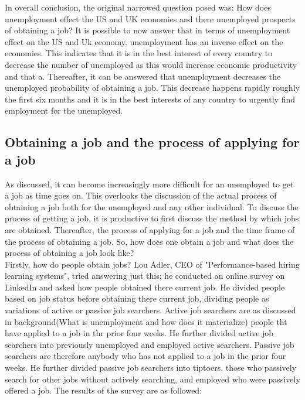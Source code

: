 In overall conclusion, the original narrowed question posed was:
How does unemployment effect the US and UK economies and there unemployed prospects of obtaining a job?
It is possible to now answer that in terms of unemployment effect on the US and Uk economy, unemployment has an inverse effect on the economies.
This indicates that it is in the best interest of every country to decrease the number of unemployed as this would increase economic productivity and that a.
Thereafter, it can be answered that unemployment decreases the unemployed probability of obtaining a job.
This decrease happens rapidly roughly the first six months and it is in the best interests of any country to urgently find employment for the unemployed. \\

\subsection{Obtaining a job and the process of applying for a job}
As discussed, it can become increasingly more difficult for an unemployed to get a job as time goes on.
This overlooks the discussion of the actual process of obtaining a job both for the unemployed and any other individual.
To discuss the process of getting a job, it is productive to first discuss the method by which jobs are obtained.
Thereafter, the process of applying for a job and the time frame of the process of obtaining a job.
So, how does one obtain a job and what does the process of obtaining a job look like? \\

Firstly, how do people obtain jobs?
Lou Adler, CEO of "Performance-based hiring learning systems", tried answering just this; he conducted an online survey on LinkedIn and asked how people obtained there current job.
He divided people based on job status before obtaining there current job, dividing people as variations of active or passive job searchers.
Active job searchers are as discussed in background(What is unemployment and how does it materialize) people tht have applied to a job in thr prior four weeks.
He further divided active job searchers into previously unemployed and employed active searchers.
Passive job searchers are therefore anybody who has not applied to a job in the prior four weeks.
He further divided passive job searchers into tiptoers, those who passively search for other jobs without actively searching, and employed who were passively offered a job.
The results of the survey are as followed: \\

